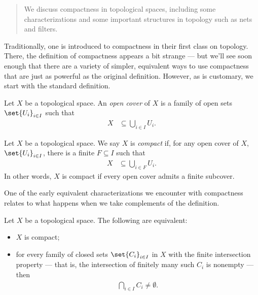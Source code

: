 \documentclass[11pt]{mypackage}
\begin{document}
\RaggedRight
\begin{abstract}
  \noindent We discuss compactness in topological spaces, including some characterizations and some important structures in topology such as nets and filters.
\end{abstract}
Traditionally, one is introduced to compactness in their first class on topology. There, the definition of compactness appears a bit strange --- but we'll see soon enough that there are a variety of simpler, equivalent ways to use compactness that are just as powerful as the original definition. However, as is customary, we start with the standard definition.
\begin{definition}
  Let $X$ be a topological space. An \textit{open cover} of $X$ is a family of open sets $\set{U_i}_{i\in I}$ such that
  \begin{align*}
    X &\subseteq \bigcup_{i\in I}U_i.
  \end{align*}
\end{definition}
\begin{definition}
  Let $X$ be a topological space. We say $X$ is \textit{compact} if, for any open cover of $X$, $\set{U_i}_{i\in I}$, there is a finite $F\subseteq I$ such that
  \begin{align*}
    X &\subseteq \bigcup_{i\in F}U_i.
  \end{align*}
  In other words, $X$ is compact if every open cover admits a finite subcover.
\end{definition}
One of the early equivalent characterizations we encounter with compactness relates to what happens when we take complements of the definition.
\begin{theorem}
  Let $X$ be a topological space. The following are equivalent:
  \begin{itemize}
    \item $X$ is compact;
    \item for every family of closed sets $\set{C_i}_{i\in I}$ in $X$ with the finite intersection property --- that is, the intersection of finitely many such $C_i$ is nonempty --- then 
      \begin{align*}
        \bigcap_{i\in I}C_i\neq \emptyset.
      \end{align*}
  \end{itemize}
\end{theorem}
\end{document}
